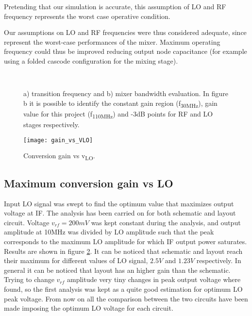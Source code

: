 Pretending that our simulation is accurate, this assumption of LO and RF frequency represents the worst case operative condition. 

Our assumptions on LO and RF frequencies were thus considered adequate, since represent the worst-case performances of the mixer.  Maximum operating frequency could thus be improved reducing output node capacitance (for example using a folded cascode configuration for the mixing stage). 
\begin{figure}[H] 
	\centering
	 \\
	\caption{a) transition frequency and b) mixer bandwidth evaluation. In figure b it is possible to identify the constant gain region (f\textsubscript{30MHz}), gain value for this project (f\textsubscript{110MHz})  and -3dB points for RF and LO stages respectively.}
	\label{fig:bandwidth}
\end{figure}


\begin{figure}[H]
	\centering
	\texttt{[image: gain\_vs\_VLO]}
	\caption{Conversion gain vs v\textsubscript{LO}.}
	\label{fig:maxGainvsLO}
\end{figure}



\subsection{Maximum conversion gain vs LO}
Input LO signal was swept to find the optimum value that maximizes output voltage at IF. The analysis has been carried on for both schematic and layout circuit. Voltage \(v_{rf}=200mV\) was kept constant during the analysis, and output amplitude at 10MHz was divided by LO amplitude such that the peak corresponds to the maximum LO amplitude for which IF output power saturates. Results are shown in figure \ref{fig:maxGainvsLO}. It can be noticed that schematic and layout reach their maximum for different values of LO signal, \(2.5V\) and \(1.23V\) respectively. 
In general it can be noticed that layout has an higher gain than the schematic. Trying to change \(v_{rf}\) amplitude very tiny changes in peak output voltage where found, so the first analysis was kept as a quite good estimation for optimum LO peak voltage. From now on all the comparison between the two circuits have been made imposing the optimum LO voltage for each circuit.

